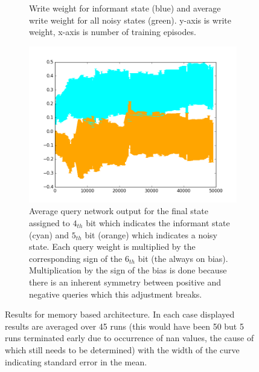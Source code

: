 \documentclass{article}
\begin{document}
\begin{figure}[!ht]
\begin{subfigure}[t]{.45\textwidth}
  \caption{Write weight for informant state (blue) and average write weight for all noisy states (green). y-axis is write weight, x-axis is number of training episodes.}
  \label{fig:1_query_write}
\end{subfigure}\vfill
\begin{subfigure}[t]{.45\textwidth}
\centering
      \includegraphics[width=1\textwidth]{images/queries.png}
  \caption{Average query network output for the final state assigned to $4_{th}$ bit which indicates the informant state (cyan) and $5_{th}$ bit (orange) which indicates a noisy state. Each query weight is multiplied by the corresponding sign of the $6_{th}$ bit (the always on bias). Multiplication by the sign of the bias is done because there is an inherent symmetry between positive and negative queries which this adjustment breaks.}
\label{fig:1_query_queries}
\end{subfigure}
\caption{Results for memory based architecture. In each case displayed results are averaged over 45 runs (this would have been 50 but 5 runs terminated early due to occurrence of nan values, the cause of which still needs to be determined) with the width of the curve indicating standard error in the mean.}
\label{fig:1_query}
\end{figure}
\end{document}
